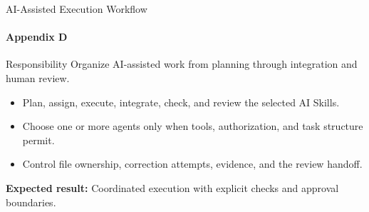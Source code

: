 \begin{frame}{AI-Assisted Execution Workflow}
\framesubtitle{Appendix D}
\begin{block}{Responsibility}
Organize AI-assisted work from planning through integration and human review.
\end{block}
\begin{itemize}
  \item Plan, assign, execute, integrate, check, and review the selected AI Skills.
  \item Choose one or more agents only when tools, authorization, and task structure permit.
  \item Control file ownership, correction attempts, evidence, and the review handoff.
\end{itemize}
\vspace{0.15cm}
\textbf{Expected result:} Coordinated execution with explicit checks and approval boundaries.
\end{frame}
